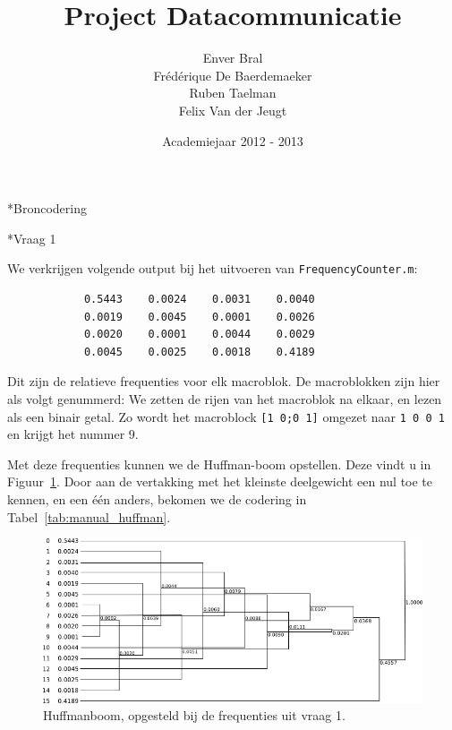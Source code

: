 \documentclass[]{article}
\title{Project Datacommunicatie}
\author{Enver Bral \\
        Fr\'ed\'erique De Baerdemaeker \\
        Ruben Taelman \\
        Felix Van der Jeugt}
\date{Academiejaar 2012 - 2013}
\begin{document}
\maketitle

\begin{section}*{Broncodering}

    \begin{subsection}*{Vraag 1}

        We verkrijgen volgende output bij het uitvoeren van
        \texttt{FrequencyCounter.m}:

        \begin{lstlisting}
            0.5443    0.0024    0.0031    0.0040
            0.0019    0.0045    0.0001    0.0026
            0.0020    0.0001    0.0044    0.0029
            0.0045    0.0025    0.0018    0.4189
        \end{lstlisting}

        Dit zijn de relatieve frequenties voor elk macroblok. De
        macroblokken zijn hier als volgt genummerd: We zetten de rijen
        van het macroblok na elkaar, en lezen als een binair getal.  Zo
        wordt het macroblock \texttt{[1 0;0 1]} omgezet naar
        \texttt{1 0 0 1} en krijgt het nummer $9$.

        Met deze frequenties kunnen we de Huffman-boom opstellen. Deze
        vindt u in Figuur~\ref{fig:manual_huffman}. Door aan de
        vertakking met het kleinste deelgewicht een nul toe te kennen,
        en een \'e\'en anders, bekomen we de codering in
        Tabel~\ref{tab:manual_huffman}.

        \begin{figure}
            \centering
            \includegraphics[width=\textwidth]{manual_huffman.png}
            \caption{Huffmanboom, opgesteld bij de frequenties uit
            \label{fig:manual_huffman}
            vraag 1.}
        \end{figure}


\end{subsection}
\end{section}
\end{document}
